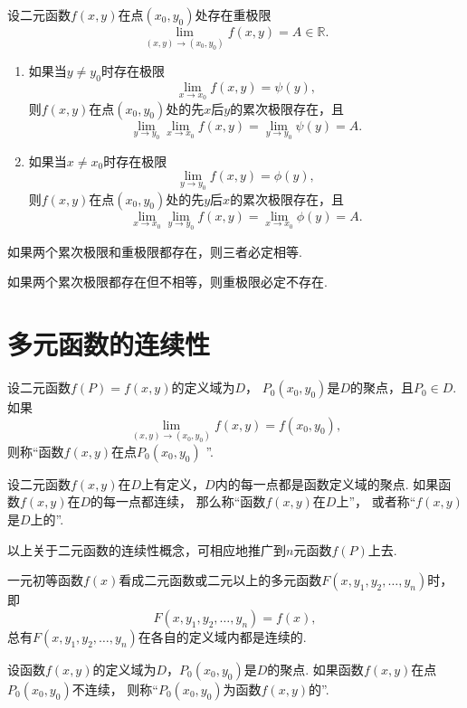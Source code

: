 \begin{theorem}
设二元函数\(f(x,y)\)在点\((x_0,y_0)\)处存在重极限\[
	\lim_{(x,y)\to(x_0,y_0)} f(x,y) = A \in \mathbb{R}.
\]\begin{enumerate}
	\item 如果当\(y \neq y_0\)时存在极限\[
		\lim_{x \to x_0} f(x,y) = \psi(y),
	\]
	则\(f(x,y)\)在点\((x_0,y_0)\)处的先\(x\)后\(y\)的累次极限存在，且\[
		\lim_{y \to y_0} \lim_{x \to x_0} f(x,y)
		= \lim_{y \to y_0} \psi(y) = A.
	\]

	\item 如果当\(x \neq x_0\)时存在极限\[
		\lim_{y \to y_0} f(x,y) = \phi(y),
	\]
	则\(f(x,y)\)在点\((x_0,y_0)\)处的先\(y\)后\(x\)的累次极限存在，且\[
		\lim_{x \to x_0} \lim_{y \to y_0} f(x,y)
		= \lim_{x \to x_0} \phi(y) = A.
	\]
\end{enumerate}
\end{theorem}

\begin{corollary}
如果两个累次极限和重极限都存在，则三者必定相等.
\end{corollary}

\begin{corollary}
如果两个累次极限都存在但不相等，则重极限必定不存在.
\end{corollary}

\section{多元函数的连续性}
\begin{definition}
设二元函数\(f(P)=f(x,y)\)的定义域为\(D\)，
\(P_0(x_0,y_0)\)是\(D\)的聚点，且\(P_0 \in D\).
如果\[
	\lim_{(x,y)\to(x_0,y_0)} f(x,y) = f(x_0,y_0),
\]
则称“函数\(f(x,y)\)在点\(P_0(x_0,y_0)\) ”.

设二元函数\(f(x,y)\)在\(D\)上有定义，\(D\)内的每一点都是函数定义域的聚点.
如果函数\(f(x,y)\)在\(D\)的每一点都连续，
那么称“函数\(f(x,y)\)在\(D\)上”，
或者称“\(f(x,y)\)是\(D\)上的”.
\end{definition}
以上关于二元函数的连续性概念，可相应地推广到\(n\)元函数\(f(P)\)上去.

一元初等函数\(f(x)\)看成二元函数或二元以上的多元函数\(F(x,y_1,y_2,\dotsc,y_n)\)时，即\[
	F(x,y_1,y_2,\dotsc,y_n) = f(x),
\]
总有\(F(x,y_1,y_2,\dotsc,y_n)\)在各自的定义域内都是连续的.

\begin{definition}
设函数\(f(x,y)\)的定义域为\(D\)，\(P_0(x_0,y_0)\)是\(D\)的聚点.
如果函数\(f(x,y)\)在点\(P_0(x_0,y_0)\)不连续，
则称“\(P_0(x_0,y_0)\)为函数\(f(x,y)\)的”.
\end{definition}

